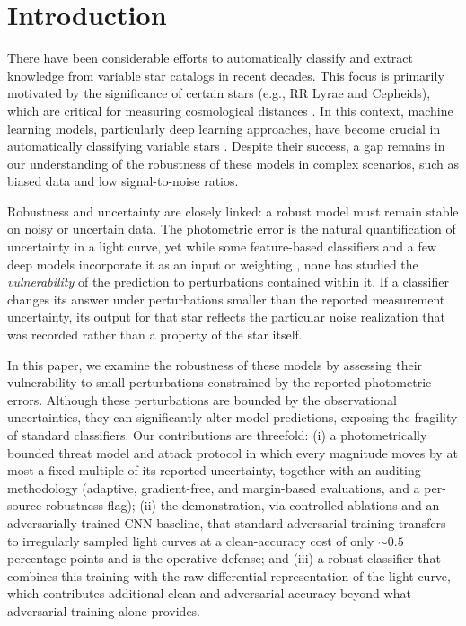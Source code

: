 \documentclass{aa}
\begin{document}
   \maketitle


\section{Introduction}
There have been considerable efforts to automatically classify and extract knowledge from variable star catalogs in recent decades. This focus is primarily motivated by the significance of certain stars (e.g., RR Lyrae and Cepheids), which are critical for measuring cosmological distances \citep{beaton2018distance,bono2024cepheids}. In this context, machine learning models, particularly deep learning approaches, have become crucial in automatically classifying variable stars \citep{aguirre2019deep}. Despite their success, a gap remains in our understanding of the robustness of these models in complex scenarios, such as biased data and low signal-to-noise ratios.

Robustness and uncertainty are closely linked: a robust model must remain stable on noisy or uncertain data. The photometric error is the natural quantification of uncertainty in a light curve, yet while some feature-based classifiers and a few deep models incorporate it as an input or weighting \citep[e.g.,][]{naul2018recurrent}, none has studied the \emph{vulnerability} of the prediction to perturbations contained within it. If a classifier changes its answer under perturbations smaller than the reported measurement uncertainty, its output for that star reflects the particular noise realization that was recorded rather than a property of the star itself.

In this paper, we examine the robustness of these models by assessing their vulnerability to small perturbations constrained by the reported photometric errors. Although these perturbations are bounded by the observational uncertainties, they can significantly alter model predictions, exposing the fragility of standard classifiers. Our contributions are threefold: (i) a photometrically bounded threat model and attack protocol in which every magnitude moves by at most a fixed multiple of its reported uncertainty, together with an auditing methodology (adaptive, gradient-free, and margin-based evaluations, and a per-source robustness flag); (ii) the demonstration, via controlled ablations and an adversarially trained CNN baseline, that standard adversarial training transfers to irregularly sampled light curves at a clean-accuracy cost of only ${\sim}0.5$ percentage points and is the operative defense; and (iii) a robust classifier that combines this training with the raw differential representation of the light curve, which contributes additional clean and adversarial accuracy beyond what adversarial training alone provides.
\end{document}
